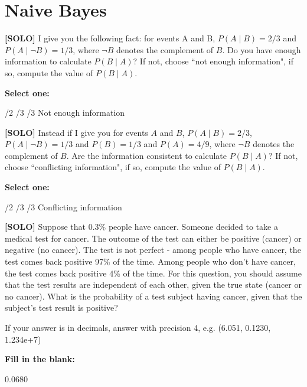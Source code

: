 \documentclass[11pt,addpoints,answers]{exam}
\newcommand{\solo}{\textbf{[SOLO]} }
\begin{document}
\section{Naive Bayes}
\begin{questions}
    \question[3] \solo I give you the following fact: for events A and B, $P(A\mid B) = 2/3$ and $P(A\mid \neg B) = 1/3$, where $\neg B$ denotes the complement of $B$. Do you have enough information to calculate $P(B\mid A)$? If not, choose ``not enough information", if so, compute the value of $P(B\mid A)$.

    \textbf{Select one:}
    \begin{checkboxes}
        /2
        /3
        /3
        \CorrectChoice Not enough information
    \end{checkboxes}
    
    
    \question[3] \solo Instead if I give you for events $A$ and $B$, $P(A\mid B) = 2/3$, $P(A\mid \neg B) = 1/3$ and $P(B) = 1/3$ and $P(A) = 4/9$, where $\neg B$ denotes the complement of $B$. Are the information consistent to calculate $P(B\mid A)$? If not, choose ``conflicting information", if so, compute the value of $P(B\mid A)$.

    \textbf{Select one:}
    \begin{checkboxes}
        /2
        /3
        /3
        \choice Conflicting information
    \end{checkboxes}
    
    
    \question[4] \solo Suppose that 0.3$\%$ people have cancer. Someone decided to take a medical test for cancer. The outcome of the test can either be positive (cancer) or negative (no cancer). The test is not perfect - among people who have cancer, the test comes back positive 97\% of the time. Among people who don’t have cancer, the test comes back positive 4\% of the time. For this question, you should assume that the test results are independent of each other, given the true state (cancer or no cancer). What is the probability of a test subject having cancer, given that the subject’s test result is positive?
    
    If your answer is in decimals, answer with precision 4, e.g. (6.051, 0.1230, 1.234e+7)

    \textbf{Fill in the blank:}
    
    \begin{tcolorbox}[fit,height=1cm, width=4cm, blank, borderline={1pt}{-2pt},nobeforeafter]
    \vspace{5pt}
    \hspace{5pt}
    0.0680
    \end{tcolorbox}
    

\end{questions}
\end{document}
